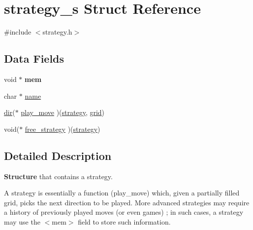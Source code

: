 \hypertarget{structstrategy__s}{\section{strategy\-\_\-s Struct Reference}
\label{structstrategy__s}
}


{\ttfamily \#include $<$strategy.\-h$>$}

\subsection*{Data Fields}
\begin{DoxyCompactItemize}
\item 
\hypertarget{structstrategy__s_a5f00e9b1b039412bb144bae39e66b97a}{void $\ast$ {\bfseries mem}}\label{structstrategy__s_a5f00e9b1b039412bb144bae39e66b97a}

\item 
char $\ast$ \hyperlink{structstrategy__s_a5ac083a645d964373f022d03df4849c8}{name}
\item 
\hyperlink{grid_8h_a862c63b15eab5b0d2781cea356e5d935}{dir}($\ast$ \hyperlink{structstrategy__s_ac4ec2cfabdd3e4b516c4164f83008809}{play\-\_\-move} )(\hyperlink{strategy_8h_a1c5c1046e8ada212d56c538c53030434}{strategy}, \hyperlink{grid_8h_a1de57b3be5a7cf6542078fcb2fd1e042}{grid})
\item 
void($\ast$ \hyperlink{structstrategy__s_a03f512455d12943d000c8287d130ac09}{free\-\_\-strategy} )(\hyperlink{strategy_8h_a1c5c1046e8ada212d56c538c53030434}{strategy})
\end{DoxyCompactItemize}


\subsection{Detailed Description}
{\bfseries Structure} that contains a strategy.

A strategy is essentially a function (play\-\_\-move) which, given a partially filled grid, picks the next direction to be played. More advanced strategies may require a history of previously played moves (or even games) ; in such cases, a strategy may use the $<$mem$>$ field to store such information. 

